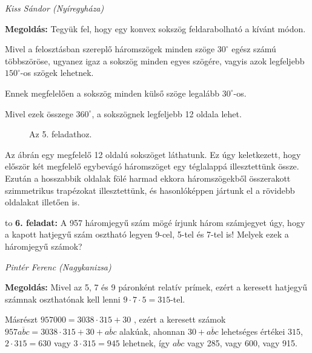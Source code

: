 \documentclass[a4paper,10pt]{article}
\newcommand{\ki}[2]{\hfill {\it #1 (#2)}\medskip}
\newcommand{\vonal}{\hbox to \hsize{\hskip2truecm\hrulefill\hskip2truecm}}
\begin{document}
\ki{Kiss Sándor}{Nyíregyháza}\medskip

{\bf Megoldás: } Tegyük fel, hogy egy konvex sokszög feldarabolható a kívánt módon.

Mivel a felosztásban szereplő háromszögek minden szöge $30^\circ$ egész számú többszöröse, u\-gyan\-ez igaz a sokszög minden egyes szögére, vagyis azok legfeljebb $150^\circ$-os szögek lehetnek.

Ennek megfelelően a sokszög minden külső szöge legalább $30^\circ$-os.

Mivel ezek összege $360^\circ$, a sokszögnek legfeljebb 12 oldala lehet.

\begin{figure}[htpb!]
\begin{center}
\end{center}
\caption*{Az 5. feladathoz.}
\end{figure}
Az ábrán egy megfelelő 12 oldalú sokszöget láthatunk. Ez úgy keletkezett, hogy először két megfelelő egybevágó háromszöget egy téglalappá illesztettünk össze. Ezután a hosszabbik oldalak fölé harmad ekkora háromszögekből összerakott szimmetrikus trapézokat  illesztettünk, és hasonlóképpen jártunk el a rövidebb oldalakat illetően is.
\medskip


\vonal
{\bf 6. feladat: } 
A 957 háromjegyű szám mögé írjunk három számjegyet úgy, hogy a kapott hatjegyű szám osztható legyen 9-cel, 5-tel és 7-tel is! Melyek ezek a háromjegyű számok?

\ki{Pintér Ferenc}{Nagykanizsa}\medskip

{\bf Megoldás: } Mivel az 5, 7 és 9 páronként relatív prímek, ezért a keresett hatjegyű számnak oszthatónak kell lenni $9\cdot7\cdot5 = 315$-tel.

Másrészt $957000=3038\cdot315 + 30$ , ezért a keresett számok $957\overline{abc}=3038\cdot315 + 30 + \overline{abc}$ alakúak, ahonnan $30 + \overline{abc}$ lehetséges értékei $315$, $2\cdot315 = 630$ vagy $3\cdot315 = 945$ lehetnek, így $\overline{abc}$ vagy 285, vagy 600, vagy 915.
\end{document}
